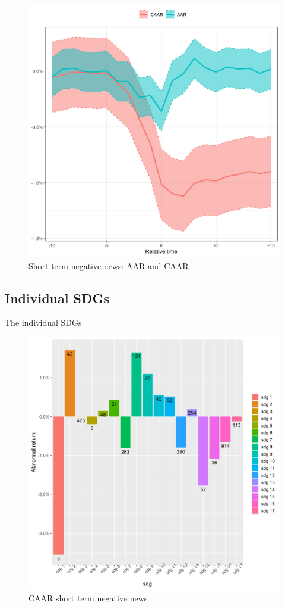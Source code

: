 \begin{figure} [H]
    \centering
    \includegraphics[scale=0.6]{Projekt/1.Figures analysis/ST_negative_all_CI.png}
    \caption{Short term negative news: AAR and CAAR}
    \label{fig:ST_neg_news}
\end{figure}


\subsection{Individual SDGs}

The individual SDGs


\begin{figure} [H]
    \centering
    \includegraphics[scale=0.6]{Projekt/1.Figures analysis/ST_negative_sdg_bar.png}
    \caption{CAAR short term negative news}
    \label{fig:ST_pos_news}
\end{figure}




